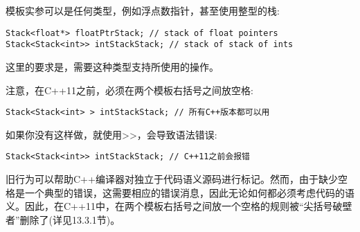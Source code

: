 模板实参可以是任何类型，例如浮点数指针，甚至使用整型的栈:

\begin{lstlisting}[style=styleCXX]
Stack<float*> floatPtrStack; // stack of float pointers
Stack<Stack<int>> intStackStack; // stack of stack of ints
\end{lstlisting}

这里的要求是，需要这种类型支持所使用的操作。

注意，在C++11之前，必须在两个模板右括号之间放空格:

\begin{lstlisting}[style=styleCXX]
Stack<Stack<int> > intStackStack; // 所有C++版本都可以用
\end{lstlisting}

如果你没有这样做，就使用>>，会导致语法错误:

\begin{lstlisting}[style=styleCXX]
Stack<Stack<int>> intStackStack; // C++11之前会报错
\end{lstlisting}

旧行为可以帮助C++编译器对独立于代码语义源码进行标记。然而，由于缺少空格是一个典型的错误，这需要相应的错误消息，因此无论如何都必须考虑代码的语义。因此，在C++11中，在两个模板右括号之间放一个空格的规则被“尖括号破壁者”删除了(详见13.3.1节)。





















